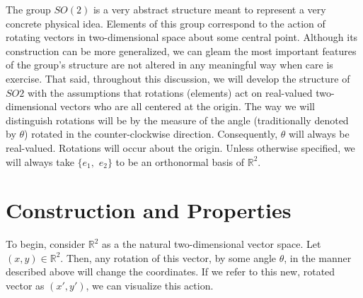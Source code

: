 \documentclass[10pt]{ucthesis}
\newcommand{\R}{\mathbb{R}}
\begin{document}
The group $SO(2)$ is a very abstract structure meant to represent a very concrete physical idea. Elements of this group correspond to the action of rotating vectors in two-dimensional space about some central point. Although its construction can be more generalized, we can gleam the most important features of the group's structure are not altered in any meaningful way when care is exercise. That said, throughout this discussion, we will develop the structure of $SO2$ with the assumptions that rotations (elements) act on real-valued two-dimensional vectors who are all centered at the origin. The way we will distinguish rotations will be by the measure of the angle (traditionally denoted by $\theta$) rotated in the counter-clockwise direction. Consequently, $\theta$ will always be real-valued. Rotations will occur about the origin. Unless otherwise specified, we will always take $\{e_1,$ $e_2\}$ to be an orthonormal basis of $\R^2$.

\section{Construction and Properties}

To begin, consider $\R^2$ as a the natural two-dimensional vector space. Let $(x,y)\in\R^2$. Then, any rotation of this vector, by some angle $\theta$, in the manner described above will change the coordinates. If we refer to this new, rotated vector as $(x',y')$, we can visualize this action.

\begin{center}
    \end{center}
\end{document}

